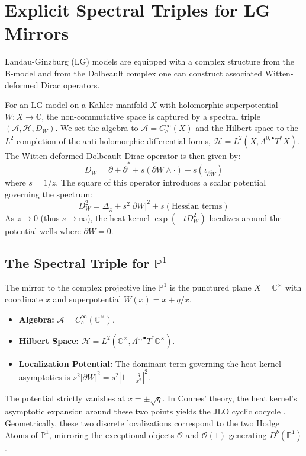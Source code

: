 \documentclass[12pt,reqno]{amsart}
\theoremstyle{remark} \newtheorem{remark}[theorem]{Remark}
\begin{document}
\section{Explicit Spectral Triples for LG Mirrors}
Landau-Ginzburg (LG) models are
equipped with a complex structure from the B-model
and from the Dolbeault complex one can construct associated Witten-deformed
Dirac operators.\cite{Witten1982}

For an LG model on a K\"{a}hler manifold $X$ with holomorphic
superpotential $W: X \to \mathbb{C}$, the non-commutative space is
captured by a spectral triple $(\mathcal{A}, \mathcal{H}, D_W)$. We
set the algebra to $\mathcal{A} = C_c^\infty(X)$ and the Hilbert space
to the $L^2$-completion of the anti-holomorphic differential forms,
$\mathcal{H} = L^2(X, \Lambda^{0,\bullet} T^* X)$. The Witten-deformed
Dolbeault Dirac operator is then given by:
\begin{equation}
    D_W = \bar{\partial} + \bar{\partial}^* + s(\partial W \wedge
    \cdot) + s(\iota_{\overline{\partial W}})
\end{equation}
where $s = 1/z$. The square of this operator introduces a scalar
potential governing the spectrum:
\begin{equation}
    D_W^2 = \Delta_{\bar{\partial}} + s^2 |\partial W|^2 +
    s(\text{Hessian terms})
\end{equation}
As $z \to 0$ (thus $s \to \infty$), the heat kernel $\exp(-t D_W^2)$
localizes around the potential wells where $\partial W = 0$.

\subsection{The Spectral Triple for $\mathbb{P}^1$}
The mirror to the complex projective line $\mathbb{P}^1$ is the
punctured plane $X = \mathbb{C}^\times$ with coordinate $x$ and
superpotential $W(x) = x + q/x$.
\begin{itemize}
    \item \textbf{Algebra:} $\mathcal{A} =
      C_c^\infty(\mathbb{C}^\times)$.
    \item \textbf{Hilbert Space:} $\mathcal{H} =
      L^2(\mathbb{C}^\times, \Lambda^{0,\bullet} T^*
      \mathbb{C}^\times)$.
    \item \textbf{Localization Potential:} The dominant term governing
      the heat kernel asymptotics is $s^2 |\partial W|^2 = s^2 \left|
      1 - \frac{q}{x^2} \right|^2$.
\end{itemize}
The potential strictly vanishes at $x = \pm \sqrt{q}$. In Connes'
theory, the heat kernel's asymptotic expansion around these two points
yields the JLO cyclic cocycle \cite{JLO1988}. Geometrically, these two
discrete localizations correspond to the two Hodge Atoms of
$\mathbb{P}^1$, mirroring the exceptional objects $\mathcal{O}$ and
$\mathcal{O}(1)$ generating $D^b(\mathbb{P}^1)$.
\end{document}
